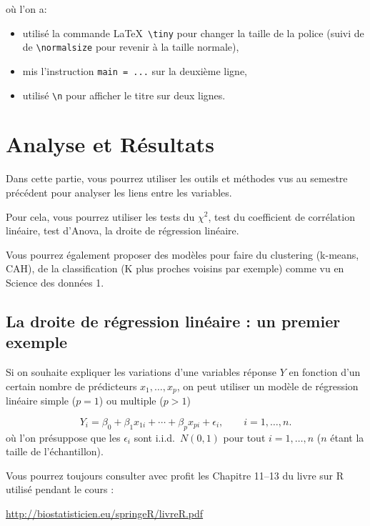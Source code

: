 \documentclass[mstat,12pt]{unswthesis}
\begin{document}
\normalsize

où l'on a:

\begin{itemize}
\tightlist
\item
  utilisé la commande \LaTeX~\texttt{\textbackslash{}tiny} pour changer
  la taille de la police (suivi de de
  \texttt{\textbackslash{}normalsize} pour revenir à la taille normale),
\item
  mis l'instruction \texttt{main\ =\ ...} sur la deuxième ligne,
\item
  utilisé \texttt{\textbackslash{}n} pour afficher le titre sur deux
  lignes.
\end{itemize}

\chapter{Analyse et Résultats}\label{analyse-et-ruxe9sultats}

Dans cette partie, vous pourrez utiliser les outils et méthodes vus au
semestre précédent pour analyser les liens entre les variables.

Pour cela, vous pourrez utiliser les tests du \(\chi^2\), test du
coefficient de corrélation linéaire, test d'Anova, la droite de
régression linéaire.

Vous pourrez également proposer des modèles pour faire du clustering
(k-means, CAH), de la classification (K plus proches voisins par
exemple) comme vu en Science des données 1.

\section{La droite de régression linéaire : un premier
exemple}\label{la-droite-de-ruxe9gression-linuxe9aire-un-premier-exemple}

Si on souhaite expliquer les variations d'une variables réponse \(Y\) en
fonction d'un certain nombre de prédicteurs \(x_1,\ldots,x_p\), on peut
utiliser un modèle de régression linéaire simple (\(p=1\)) ou multiple
(\(p>1\))

\[
Y_i = \beta_0 + \beta_1 x_{1i} + \cdots +\beta_p x_{pi} + \epsilon_i, \qquad i=1,\ldots,n.
\] où l'on présuppose que les \(\epsilon_i\) sont i.i.d.~\(N(0,1)\) pour
tout \(i=1,\ldots,n\) (\(n\) étant la taille de l'échantillon).

Vous pourrez toujours consulter avec profit les Chapitre 11--13 du livre
sur R utilisé pendant le cours :

\url{http://biostatisticien.eu/springeR/livreR.pdf}
\end{document}
